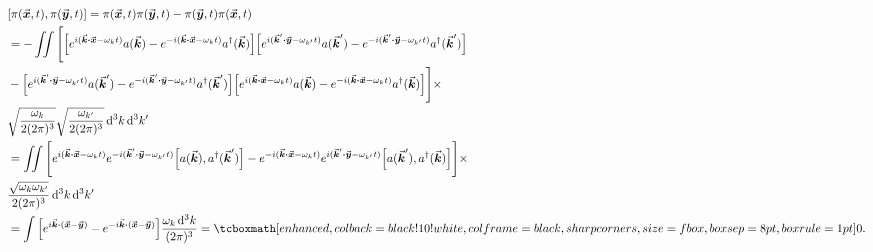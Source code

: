 \begin{align}
    \label{eq:comm-pi-pi}
    &[\pi(\va*{x},t),\pi(\va*{y},t)] = \pi(\va*{x},t)\pi(\va*{y},t) - \pi(\va*{y},t)\pi(\va*{x},t) \\
                                     &= - \iint \Bigg[ \Big[ e^{i(\va*{k}\vdot\va*{x} - \omega_{k}t)}a(\va*{k}) - e^{-i(\va*{k}\vdot \va*{x} - \omega_{k}t)}a^{\dagger}(\va*{k}) \Big] \Big[ e^{i(\va*{k}'\vdot\va*{y} - \omega_{k'}t)}a(\va*{k}') - e^{-i(\va*{k}'\vdot \va*{y} - \omega_{k'}t)}a^{\dagger}(\va*{k}') \Big] \notag \\
                                     &-  \Big[ e^{i(\va*{k}'\vdot\va*{y} - \omega_{k'}t)}a(\va*{k}') - e^{-i(\va*{k}'\vdot \va*{y} - \omega_{k'}t)}a^{\dagger}(\va*{k}') \Big] \Big[ e^{i(\va*{k}\vdot\va*{x} - \omega_{k}t)}a(\va*{k}) - e^{-i(\va*{k}\vdot \va*{x} - \omega_{k}t)}a^{\dagger}(\va*{k}) \Big] \Bigg] \times \notag \\
                                     &\sqrt{\frac{\omega_{k}}{2(2\pi)^3}}\sqrt{\frac{\omega_{k'}}{2(2\pi)^3}} \dd[3]{k} \dd[3]{k'} \\
                                     &= \iint \Bigg[ e^{i(\va*{k} \vdot \va*{x} - \omega_{k}t)}e^{-i(\va*{k}' \vdot \va*{y} - \omega_{k'}t)}\Big[a(\va*{k}),a^{\dagger}(\va*{k}')\Big] - e^{-i(\va*{k} \vdot \va*{x} - \omega_{k}t)}e^{i(\va*{k}' \vdot \va*{y} - \omega_{k'}t)} \Big[a(\va*{k}'),a^{\dagger}(\va*{k}) \Big] \Bigg] \times \notag \\
                                     &\frac{\sqrt{\omega_{k}\omega_{k'}}}{2(2\pi)^3} \dd[3]{k}\dd[3]{k'} \\
                                     &= \int \Big[ e^{i \va*{k} \vdot (\va*{x} - \va*{y})} - e^{-i \va*{k} \vdot (\va*{x} - \va*{y})} \Big] \frac{\omega_{k} \dd[3]{k}}{(2\pi)^3} = \eqbox{0}
.\end{align}



